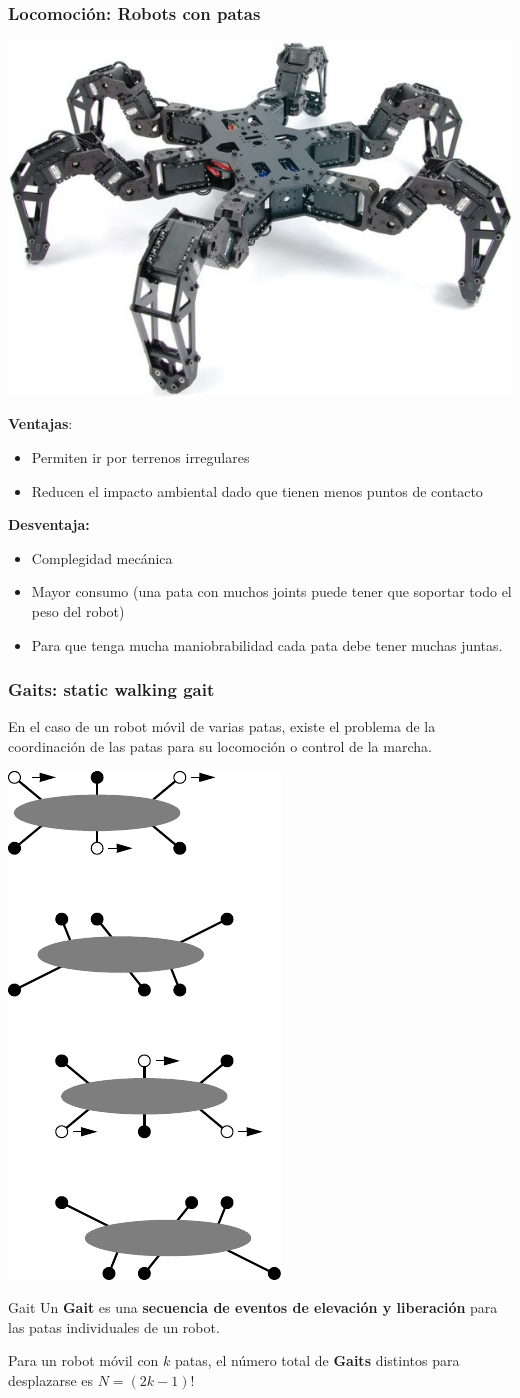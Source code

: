 \begin{frame}
    \frametitle{Locomoción: Robots con patas}

    \begin{center}
        \includegraphics[width=0.4\columnwidth]{images/hexapod_phantomX_mark_II.jpg}
    \end{center}
    \footnotesize
    {\bf Ventajas}:
    \begin{itemize}
        \item Permiten ir por terrenos irregulares
        \item Reducen el impacto ambiental dado que tienen menos puntos de contacto
    \end{itemize}
    {\bf Desventaja: }
    \begin{itemize}
        \item Complegidad mecánica
        \item Mayor consumo (una pata con muchos joints puede tener que soportar todo el peso del robot)
        \item Para que tenga mucha maniobrabilidad cada pata debe tener muchas juntas.
\end{itemize}

\end{frame}


\begin{frame}
    \frametitle{Gaits: static walking gait}
	\small
    En el caso de un robot móvil de varias patas, existe el problema de la coordinación de las patas para su locomoción o control de la marcha.

    \begin{center}
        \includegraphics[width=0.15\columnwidth]{images/hexapod_static_walking_gait.pdf}
    \end{center}

	
	\begin{block}{Gait}
    	Un \textbf{Gait} es una \textbf{secuencia de eventos de elevación y liberación} para las patas individuales de un robot.
	\end{block}


    
    Para un robot móvil con $k$ patas, el número total de \textbf{Gaits} distintos para desplazarse es $N = \left( 2k - 1\right)!$
    
\end{frame}

